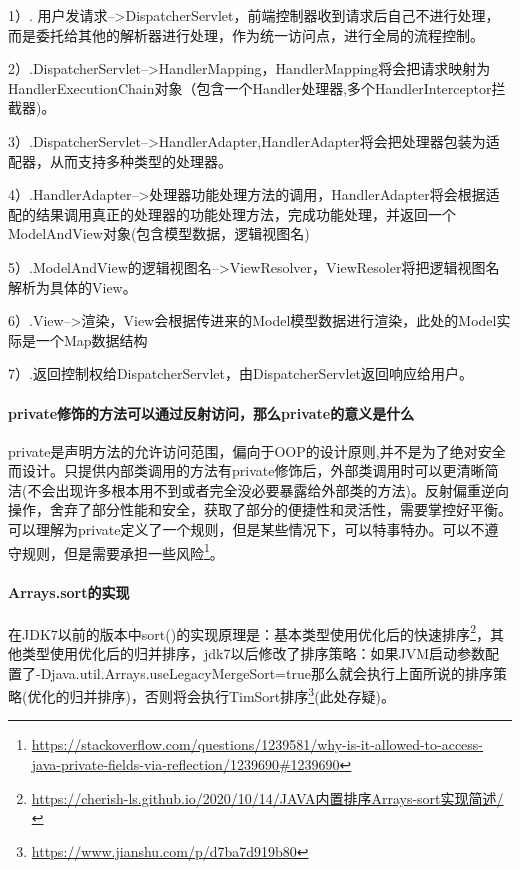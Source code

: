 \documentclass[../../../interview-questions.tex]{subfiles}
\begin{document}
1）. 用户发请求-->DispatcherServlet，前端控制器收到请求后自己不进行处理，而是委托给其他的解析器进行处理，作为统一访问点，进行全局的流程控制。

2）.DispatcherServlet-->HandlerMapping，HandlerMapping将会把请求映射为HandlerExecutionChain对象（包含一个Handler处理器,多个HandlerInterceptor拦截器)。

3）.DispatcherServlet-->HandlerAdapter,HandlerAdapter将会把处理器包装为适配器，从而支持多种类型的处理器。

4）.HandlerAdapter-->处理器功能处理方法的调用，HandlerAdapter将会根据适配的结果调用真正的处理器的功能处理方法，完成功能处理，并返回一个ModelAndView对象(包含模型数据，逻辑视图名)

5）.ModelAndView的逻辑视图名-->ViewResolver，ViewResoler将把逻辑视图名解析为具体的View。

6）.View-->渲染，View会根据传进来的Model模型数据进行渲染，此处的Model实际是一个Map数据结构

7）.返回控制权给DispatcherServlet，由DispatcherServlet返回响应给用户。

\paragraph{private修饰的方法可以通过反射访问，那么private的意义是什么}

private是声明方法的允许访问范围，偏向于OOP的设计原则,并不是为了绝对安全而设计。只提供内部类调用的方法有private修饰后，外部类调用时可以更清晰简洁(不会出现许多根本用不到或者完全没必要暴露给外部类的方法)。反射偏重逆向操作，舍弃了部分性能和安全，获取了部分的便捷性和灵活性，需要掌控好平衡。可以理解为private定义了一个规则，但是某些情况下，可以特事特办。可以不遵守规则，但是需要承担一些风险\footnote{\url{https://stackoverflow.com/questions/1239581/why-is-it-allowed-to-access-java-private-fields-via-reflection/1239690\#1239690}}。


\paragraph{Arrays.sort的实现}

在JDK7以前的版本中sort()的实现原理是：基本类型使用优化后的快速排序\footnote{\url{https://cherish-ls.github.io/2020/10/14/JAVA内置排序Arrays-sort实现简述/}}，其他类型使用优化后的归并排序，jdk7以后修改了排序策略：如果JVM启动参数配置了-Djava.util.Arrays.useLegacyMergeSort=true那么就会执行上面所说的排序策略(优化的归并排序)，否则将会执行TimSort排序\footnote{\url{https://www.jianshu.com/p/d7ba7d919b80}}(此处存疑)。
\end{document}
